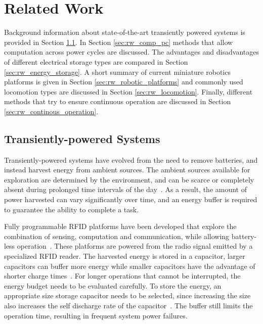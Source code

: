 \chapter{Related Work}
\label{chp:related_work}

Background information about state-of-the-art transiently powered systems is provided in Section \ref{sec:rw_tp_systems}.
In Section \ref{sec:rw_comp_pc} methods that allow computation across power cycles are discussed.
The advantages and disadvantages of different electrical storage types are compared in Section \ref{sec:rw_energy_storage}. 
A short summary of current miniature robotics platforms is given in Section \ref{sec:rw_robotic_platforms} and commonly used locomotion types are discussed in Section \ref{sec:rw_locomotion}. 
Finally, different methods that try to ensure continuous operation are discussed in Section \ref{sec:rw_continous_operation}.

\section{Transiently-powered Systems}
\label{sec:rw_tp_systems}

Transiently-powered systems have evolved from the need to remove batteries, and instead harvest energy from ambient sources.
The ambient sources available for exploration are determined by the environment, and can be scarce or completely absent during prolonged time intervals of the day~\cite{konstantopoulos_im_2016}.
As a result, the amount of power harvested can vary significantly over time, and an energy buffer is required to guarantee the ability to complete a task.

Fully programmable RFID platforms have been developed that explore the combination of sensing, computation and communication, while allowing battery-less operation~\cite{sample_transim_2008}.
These platforms are powered from the radio signal emitted by a specialized RFID reader. 
The harvested energy is stored in a capacitor, larger capacitors can buffer more energy while smaller capacitors have the advantage of shorter charge times~\cite{gummerson_mobisys_2010}.
For longer operations that cannot be interrupted, the energy budget needs to be evaluated carefully.
To store the energy, an appropriate size storage capacitor needs to be selected, since increasing the size also increases the self discharge rate of the capacitor~\cite{naderiparizi_rfid_2015}.
The buffer still limits the operation time, resulting in frequent system power failures.

